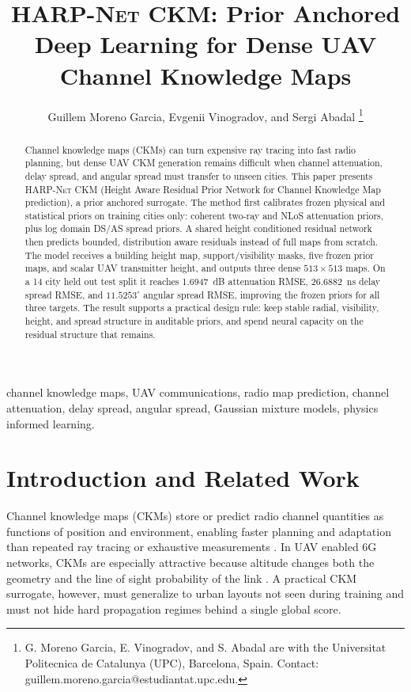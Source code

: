 \documentclass[journal]{IEEEtran}
\title{\textsc{HARP-Net CKM}: Prior Anchored Deep Learning for Dense UAV Channel Knowledge Maps}
\author{Guillem Moreno Garcia, Evgenii Vinogradov, and Sergi Abadal%
\thanks{G. Moreno Garcia, E. Vinogradov, and S. Abadal are with the
Universitat Politecnica de Catalunya (UPC), Barcelona, Spain. Contact:
guillem.moreno.garcia@estudiantat.upc.edu.}%
}
\begin{document}
\maketitle

\begin{abstract}
Channel knowledge maps (CKMs) can turn expensive ray tracing into fast radio
planning, but dense UAV CKM generation remains difficult when channel
attenuation, delay spread, and angular spread must transfer to unseen cities.
This paper presents \textsc{HARP-Net CKM} (Height Aware Residual Prior Network
for Channel Knowledge Map prediction), a prior anchored surrogate. The method
first calibrates frozen physical and statistical priors on training cities
only: coherent two-ray and NLoS attenuation priors, plus log domain DS/AS
spread priors. A shared height conditioned residual network then predicts
bounded, distribution aware residuals instead of full maps from scratch. The
model receives a building height map, support/visibility masks, five frozen
prior maps, and scalar UAV transmitter height, and outputs three dense
\(513\times513\) maps. On a 14 city held out test split it reaches
\SI{1.6947}{dB} attenuation RMSE, \SI{26.6882}{ns} delay spread RMSE, and
\(11.5253^\circ\) angular spread RMSE, improving the frozen priors for all
three targets. The result supports a practical design rule: keep stable radial,
visibility, height, and spread structure in auditable priors, and spend neural
capacity on the residual structure that remains.
\end{abstract}

\begin{IEEEkeywords}
channel knowledge maps, UAV communications, radio map prediction, channel attenuation,
delay spread, angular spread, Gaussian mixture models, physics informed
learning.
\end{IEEEkeywords}

\section{Introduction and Related Work}

Channel knowledge maps (CKMs) store or predict radio channel quantities as
functions of position and environment, enabling faster planning and adaptation
than repeated ray tracing or exhaustive measurements \cite{zengx2021ckm,
ckmtutorial2024}. In UAV enabled 6G networks, CKMs are especially attractive
because altitude changes both the geometry and the line of sight probability of
the link \cite{khawaja_survey,saboor2025height}. A practical CKM surrogate,
however, must generalize to urban layouts not seen during training and must not
hide hard propagation regimes behind a single global score.
\end{document}
